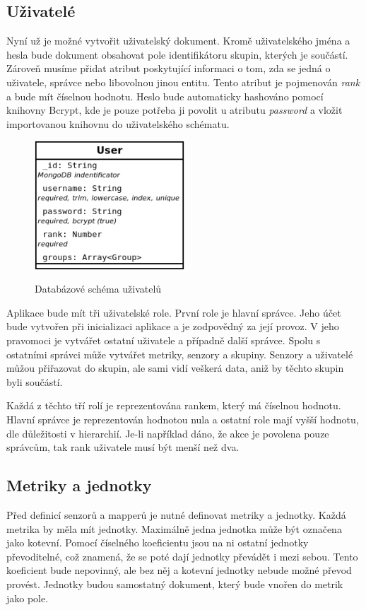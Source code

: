 \documentclass[thesis=M,czech]{FITthesis}[2018/10/20]
\begin{document}
\subsection{Uživatelé}
Nyní už je možné vytvořit uživatelský dokument. Kromě uživatelského jména a hesla bude dokument obsahovat pole identifikátoru skupin, kterých je součástí. Zároveň musíme přidat atribut poskytující informaci o tom, zda se jedná o uživatele, správce nebo libovolnou jinou entitu. Tento atribut je pojmenován \textit{rank} a bude mít číselnou hodnotu. Heslo bude automaticky hashováno pomocí knihovny Bcrypt, kde je pouze potřeba ji povolit u atributu \textit{password} a vložit importovanou knihovnu do uživatelského schématu.


\begin{figure}[h]
\caption{Databázové schéma uživatelů}
\centering
\includegraphics[width=0.50\textwidth]{diagrams/user}
\label{fig:user_schema}
\end{figure}

Aplikace bude mít tři uživatelské role. První role je hlavní správce. Jeho účet bude vytvořen při inicializaci aplikace a je zodpovědný za její provoz. V jeho pravomoci je vytvářet ostatní uživatele a případně další správce. Spolu s ostatními správci může vytvářet metriky, senzory a skupiny. Senzory a uživatelé můžou přiřazovat do skupin, ale sami vidí veškerá data, aniž by těchto skupin byli součástí. 

Každá z těchto tří rolí je reprezentována rankem, který má číselnou hodnotu. Hlavní správce je reprezentován hodnotou nula a ostatní role mají vyšší hodnotu, dle důležitosti v hierarchií. Je-li například dáno, že akce je povolena pouze správcům, tak rank uživatele musí být menší než dva.
\newpage
\subsection{Metriky a jednotky}
Před definicí senzorů a mapperů je nutné definovat metriky a jednotky. Každá metrika by měla mít jednotky. Maximálně jedna jednotka může být označena jako kotevní. Pomocí číselného koeficientu jsou na ni ostatní jednotky převoditelné, což znamená, že se poté dají jednotky převádět i mezi sebou. Tento koeficient bude nepovinný, ale bez něj a kotevní jednotky nebude možné převod provést. Jednotky budou samostatný dokument, který bude vnořen do metrik jako pole.
\end{document}
